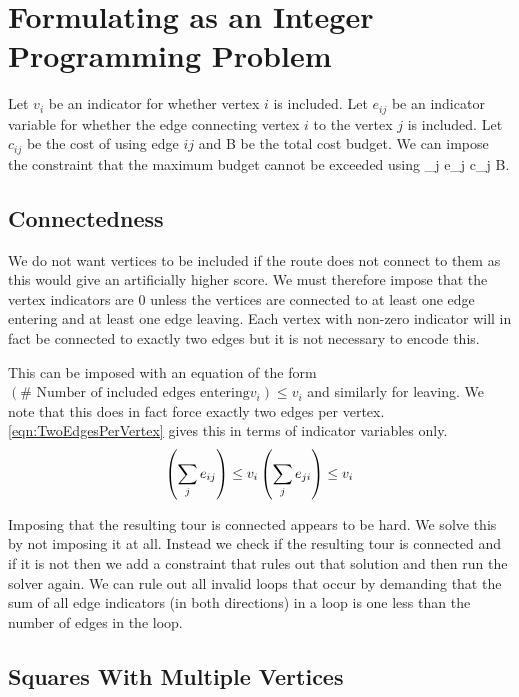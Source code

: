 \section{Formulating as an Integer Programming Problem}

Let $v_i$ be an indicator for whether vertex $i$ is included. Let $e_{ij}$ be an indicator variable for whether the edge connecting vertex $i$ to the vertex $j$ is included. Let $c_{ij}$ be the cost of using edge $ij$ and B be the total cost budget. We can impose the constraint that the maximum budget cannot be exceeded using \sum_{j} e_j c_j \le B.

\subsection{Connectedness}

We do not want vertices to be included if the route does not connect to them as this would give an artificially higher score. We must therefore impose that the vertex indicators are 0 unless the vertices are connected to at least one edge entering and at least one edge leaving. Each vertex with non-zero indicator will in fact be connected to exactly two edges but it is not necessary to encode this.

This can be imposed with an equation of the form $(\text{# Number of included edges entering} v_i) \le v_i$ and similarly for leaving. We note that this does in fact force exactly two edges per vertex. \eqref{eqn:TwoEdgesPerVertex} gives this in terms of indicator variables only.
\begin{equation}
	\left( \sum_j e_{ij} \right) \le v_i  \\
	\left( \sum_j e_{ji} \right) \le v_i  \\
	\label{eqn:TwoEdgesPerVertex}
\end{equation}

Imposing that the resulting tour is connected appears to be hard. We solve this by not imposing it at all. Instead we check if the resulting tour is connected and if it is not then we add a constraint that rules out that solution and then run the solver again. We can rule out all invalid loops that occur by demanding that the sum of all edge indicators (in both directions) in a loop is one less than the number of edges in the loop.

\subsection{Squares With Multiple Vertices}

